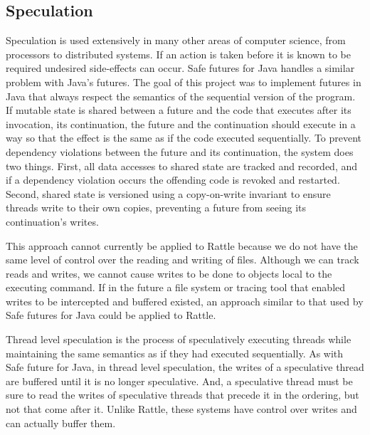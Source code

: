 \subsection{Speculation}

Speculation is used extensively in many other areas of computer science, from processors to distributed systems.  If an action is taken before it is known to be required undesired side-effects can
occur.  Safe futures for Java \cite{welc2005safe} handles a similar problem with Java's futures.
The goal of this project was to implement futures in Java that always respect the semantics of the
sequential version of the program.  If mutable state is shared between a future and the
code that executes after its invocation, its continuation, the future and the continuation should
execute in a way so that the effect is the same as if the code executed sequentially.
To prevent dependency violations between the future and its continuation, the system does two things. First, all data accesses to shared state are tracked and recorded, and if a dependency violation occurs the offending code is revoked and restarted.  Second, shared state is versioned using a copy-on-write invariant to ensure threads write to their own copies, preventing a future from seeing its continuation's writes.

This approach cannot currently be applied to Rattle because we do not have the same level of control over the reading and writing of files. Although we can track reads and writes, we cannot cause writes to be done to objects local to the executing command.  If in the future a file system or tracing tool that enabled writes to be intercepted and buffered existed, an approach similar to that used by Safe futures for Java could be applied to Rattle.

Thread level speculation is the process of speculatively executing threads while maintaining the same semantics as if they had executed sequentially.  As with Safe future for Java, in thread
level speculation, the writes of a speculative thread are buffered until it is no longer
speculative.  And, a speculative thread must be sure to read the writes of speculative threads
that precede it in the ordering, but not that come after it.  Unlike Rattle, these systems have
control over writes and can actually buffer them.   %


\begin{comment}
\subsection{Other related work}

The notion of hazards is used extensively in processor design. This is standard terminology.
\end{comment}
